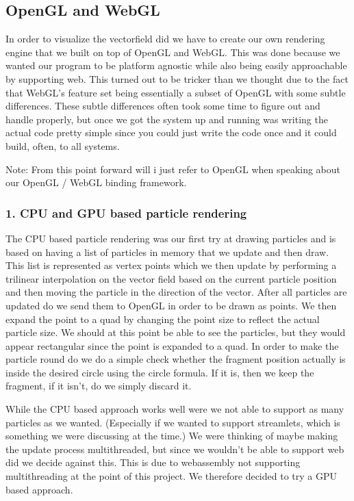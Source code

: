 \documentclass{article}
\begin{document}
\subsection*{OpenGL and WebGL}

In order to visualize the vectorfield did we have to create our own rendering engine that we built on top of OpenGL and WebGL. This was done because we wanted our program to be platform agnostic while also being easily approachable by supporting web. This turned out to be tricker than we thought due to the fact that WebGL's feature set being essentially a subset of OpenGL with some subtle differences. These subtle differences often took some time to figure out and handle properly, but once we got the system up and running was writing the actual code pretty simple since you could just write the code once and it could build, often, to all systems. 

Note: From this point forward will i just refer to OpenGL when speaking about our OpenGL / WebGL binding framework.

\subsubsection*{1. CPU and GPU based particle rendering}

The CPU based particle rendering was our first try at drawing particles and is based on having a list of particles in memory that we update and then draw. This list is represented as vertex points which we then update by performing a trilinear interpolation on the vector field based on the current particle position and then moving the particle in the direction of the vector. After all particles are updated do we send them to OpenGL in order to be drawn as points. We then expand the point to a quad by changing the point size to reflect the actual particle size. We should at this point be able to see the particles, but they would appear rectangular since the point is expanded to a quad. In order to make the particle round do we do a simple check whether the fragment position actually is inside the desired circle using the circle formula. If it is, then we keep the fragment, if it isn't, do we simply discard it.

While the CPU based approach works well were we not able to support as many particles as we wanted. (Especially if we wanted to support streamlets, which is something we were discussing at the time.) We were thinking of maybe making the update process multithreaded, but since we wouldn't be able to support web did we decide against this. This is due to webassembly not supporting multithreading at the point of this project. We therefore decided to try a GPU based approach.
\end{document}
